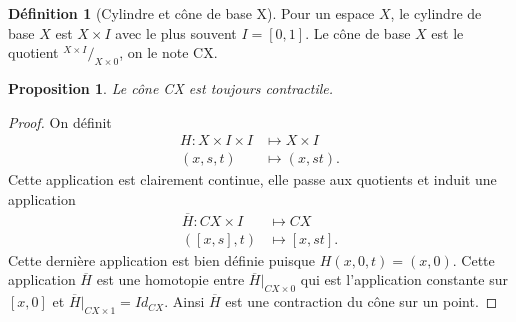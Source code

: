 \documentclass[12pt]{book}
\newtheorem{prop}[lemma]{Proposition}
\theoremstyle{definition}
\newtheorem{definition}[lemma]{Définition}
\theoremstyle{remark}
\newcommand*\quot[2]{{^{\textstyle #1}\big/_{\textstyle #2}}}
\begin{document}
	\begin{definition}[Cylindre et cône de base X]
		Pour un espace $X$, le cylindre de base $X$ est $X \times I$ avec le plus souvent $I = [0,1]$.
		Le cône de base $X$ est le quotient $\quot{X\times I}{X \times 0}$, on le note CX.
	\end{definition}
	\begin{prop}
		Le cône CX est toujours contractile.	
	\end{prop}
	\begin{proof}
		On définit 
		\begin{align*}
			H : X \times I \times I &\longmapsto X \times I \\
			(x,s,t) &\longmapsto (x,st)
		.\end{align*}
		Cette application est clairement continue, elle passe aux quotients et induit une application
		\begin{align*}
			\overline{H} : CX \times I &\longmapsto CX \\
			([x,s],t) &\longmapsto [x,st]
		.\end{align*}
		Cette dernière application est bien définie puisque $H(x,0,t) = (x,0)$. Cette application  $\overline{H}$ est une homotopie entre $\overline{H} \vert_{CX \times 0}$
		qui est l'application constante sur $[x,0]$ et $\overline{H} \vert _{CX \times 1} = Id_{CX}$.
		Ainsi  $\overline{H}$ est une contraction du cône sur un point.
	\end{proof}
\end{document}
